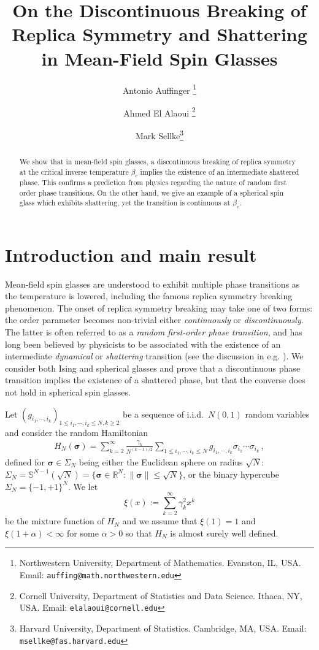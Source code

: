 \documentclass[11pt]{article}
\author{
Antonio Auffinger \thanks{Northwestern University, Department of Mathematics. Evanston, IL, USA. Email: \texttt{auffing@math.northwestern.edu}}
\and
Ahmed El Alaoui \thanks{Cornell University, Department of Statistics and Data Science. Ithaca, NY, USA. Email: \texttt{elalaoui@cornell.edu}}
\and
Mark Sellke\thanks{Harvard University, Department of Statistics. Cambridge, MA, USA. Email: \texttt{msellke@fas.harvard.edu}}
}
\title{On the Discontinuous Breaking of Replica Symmetry and Shattering in Mean-Field Spin Glasses}
\date{}
\theoremstyle{definition}
\numberwithin{equation}{section}
\def\reals{{\mathbb R}}
\newcommand{\<}{\langle}
\renewcommand{\>}{\rangle}
\def\bsigma{{\boldsymbol{\sigma}}}
\newcommand{\Sph}{\mathbb{S}}
\begin{document}
\maketitle


\begin{abstract}
\noindent
We show that in mean-field spin glasses, a discontinuous breaking of replica symmetry at the critical inverse temperature $\beta_c$ implies the existence of an intermediate shattered phase.  
This confirms a prediction from physics regarding the nature of random first order phase transitions. On the other hand, we give an example of a spherical spin glass which exhibits shattering, yet the transition is continuous at $\beta_c$.  
\end{abstract}


\section{Introduction and main result}


Mean-field spin glasses are understood to exhibit multiple phase transitions as the temperature is lowered, including the famous replica symmetry breaking phenomenon.
The onset of replica symmetry breaking may take one of two forms: the order parameter becomes non-trivial either \emph{continuously} or \emph{discontinuously}.
The latter is often referred to as a \emph{random first-order phase transition}, and has long been believed by physicists to be associated with the existence of an intermediate \emph{dynamical} or \emph{shattering} transition (see the discussion in e.g. \cite{mezard1996tentative,franz2013note,kirkpatrick2014universal}).
We consider both Ising and spherical glasses and prove that a discontinuous phase transition implies the existence of a shattered phase, but that the converse does not hold in spherical spin glasses.


 Let $(g_{i_1,\cdots,i_k})_{1 \le i_1,\cdots,i_k \le N, k \ge 2}$ be a sequence of i.i.d.\ $N(0,1)$ random variables and consider the random Hamiltonian 
\begin{align}\label{eq:hamiltonian}
%
H_N(\bsigma) =  \sum_{k=2}^{\infty} \frac{\gamma_k}{N^{(k-1)/2}}  \sum_{1\le i_1 ,\cdots , i_k\le N} g_{i_1,\cdots,i_k}\sigma_{i_1}\cdots\sigma_{i_k} \,,
%
\end{align}
defined for $\bsigma \in \Sigma_N$ being either the Euclidean sphere on radius $\sqrt{N}$: $\Sigma_N = \Sph^{N-1}(\sqrt{N}) =\{\bsigma \in \reals^N : \|\bsigma\| \le \sqrt{N}\}$, or the binary hypercube $\Sigma_N = \{-1,+1\}^N$.
%
We let 
\[\xi(x) := \sum_{k=2}^{\infty} \gamma_k^2 x^k\]  
be the mixture function of $H_N$ and we assume that $\xi(1)=1$ and $\xi(1+\alpha) <\infty$ for some $\alpha>0$ so that $H_N$ is almost surely well defined.  
\end{document}
